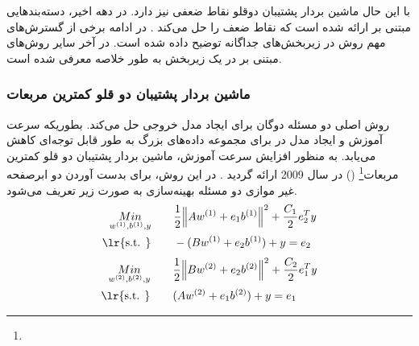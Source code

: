 با این حال ماشین بردار پشتیبان دوقلو نقاط ضعفی نیز دارد. در دهه اخیر، دسته‌بند‌هایی مبتنی بر  ارائه شده است که نقاط ضعف  را حل می‌کند \cite{ding2014,ding2017,huang2018}. در ادامه برخی از گسترش‌های مهم روش  در زیربخش‌های جداگانه توضیح داده شده است. در آخر سایر روش‌های مبتنی بر  در یک زیربخش به طور خلاصه معرفی شده است.

\subsubsection{ماشین بردار پشتیبان دو قلو کمترین مربعات}\label{sec:2:2:3:1}
روش  اصلی دو مسئله دوگان برای ایجاد مدل خروجی حل می‌کند. بطوریکه سرعت آموزش و ایجاد مدل در  برای مجموعه داده‌های بزرگ به طور قابل توجه‌ای کاهش می‌یابد. به منظور افزایش سرعت آموزش، ماشین بردار پشتیبان دو قلو کمترین مربعات\footnote{}  ()  در سال 2009 ارائه گردید \cite{kumar2009}. در این روش، برای بدست آوردن دو ابرصفحه غیر موازی دو مسئله بهینه‌سازی به صورت زیر تعریف می‌شود.
\begin{equation}
\begin{split}
 \underset{{{w}^{(1)}},{{b}^{(1)}},y}{\mathop{Min}} \qquad &\frac{1}{2}{{\left\| A{{w}^{(1)}}+{{e}_{1}}{{b}^{(1)}} \right\|}^{2}}+\frac{{{C}_{1}}}{2}e_{2}^{T}y \\ 
\textrm{\lr{s.t. }} \qquad & -(B{{w}^{(1)}}+{{e}_{2}}{{b}^{(1)}})+y={{e}_{2}}
\end{split}
\label{eq:46}
\end{equation}
\begin{equation}
\begin{split}
\underset{{{w}^{(2)}},{{b}^{(2)}},y}{\mathop{Min}} \qquad & \frac{1}{2}{{\left\| B{{w}^{(2)}}+{{e}_{2}}{{b}^{(2)}} \right\|}^{2}}+\frac{{{C}_{2}}}{2}e_{1}^{T}y \\ 
\textrm{\lr{s.t. }} \qquad & (A{{w}^{(2)}}+{{e}_{1}}{{b}^{(2)}})+y={{e}_{1}}
\end{split}
\label{eq:47}
\end{equation}

